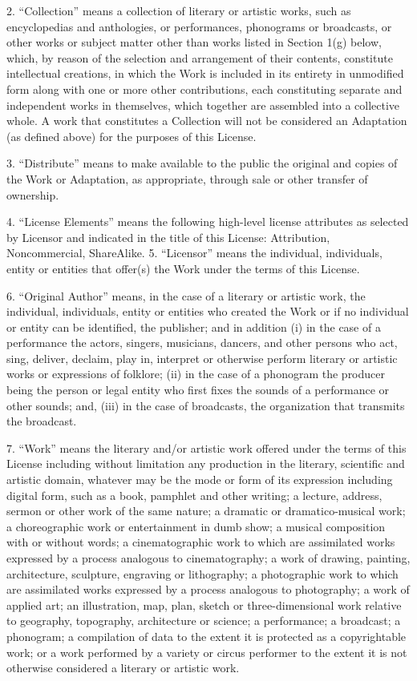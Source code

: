 2. ``Collection'' means a collection of literary or artistic works,
such as encyclopedias and anthologies, or performances, phonograms
or broadcasts, or other works or subject matter other than works
listed in Section 1(g) below, which, by reason of the selection and
arrangement of their contents, constitute intellectual creations,
in which the Work is included in its entirety in unmodified form
along with one or more other contributions, each constituting
separate and independent works in themselves, which together are
assembled into a collective whole. A work that constitutes a
Collection will not be considered an Adaptation (as defined above)
for the purposes of this License.

3. ``Distribute'' means to make available to the public the original
and copies of the Work or Adaptation, as appropriate, through sale
or other transfer of ownership.

4. ``License Elements'' means the following high-level license
attributes as selected by Licensor and indicated in the title of
this License: Attribution, Noncommercial, ShareAlike. 5. ``Licensor''
means the individual, individuals, entity or entities that offer(s)
the Work under the terms of this License.

6. ``Original Author'' means, in the case of a literary or artistic
work, the individual, individuals, entity or entities who created
the Work or if no individual or entity can be identified, the
publisher; and in addition (i) in the case of a performance the
actors, singers, musicians, dancers, and other persons who act,
sing, deliver, declaim, play in, interpret or otherwise perform
literary or artistic works or expressions of folklore; (ii) in the
case of a phonogram the producer being the person or legal entity
who first fixes the sounds of a performance or other sounds; and,
(iii) in the case of broadcasts, the organization that transmits
the broadcast.

7. ``Work'' means the literary and/or artistic work offered under the
terms of this License including without limitation any production
in the literary, scientific and artistic domain, whatever may be
the mode or form of its expression including digital form, such as
a book, pamphlet and other writing; a lecture, address, sermon or
other work of the same nature; a dramatic or dramatico-musical
work; a choreographic work or entertainment in dumb show; a musical
composition with or without words; a cinematographic work to which
are assimilated works expressed by a process analogous to
cinematography; a work of drawing, painting, architecture,
sculpture, engraving or lithography; a photographic work to which
are assimilated works expressed by a process analogous to
photography; a work of applied art; an illustration, map, plan,
sketch or three-dimensional work relative to geography, topography,
architecture or science; a performance; a broadcast; a phonogram; a
compilation of data to the extent it is protected as a
copyrightable work; or a work performed by a variety or circus
performer to the extent it is not otherwise considered a literary
or artistic work.

